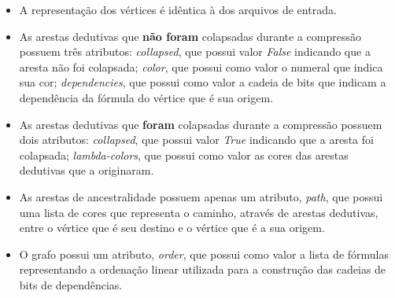 \begin{itemize}
    \item A representação dos vértices é idêntica à dos arquivos de entrada.
    \item As arestas dedutivas que \textbf{não foram} colapsadas durante a compressão possuem três atributos: \textit{collapsed}, que possui valor \textit{False} indicando que a aresta não foi colapsada; \textit{color}, que possui como valor o numeral que indica sua cor; \textit{dependencies}, que possui como valor a cadeia de bits que indicam a dependência da fórmula do vértice que é sua origem.
    \item As arestas dedutivas que \textbf{foram} colapsadas durante a compressão possuem dois atributos: \textit{collapsed}, que possui valor \textit{True} indicando que a aresta foi colapsada; \textit{lambda-colors}, que possui como valor as cores das arestas dedutivas que a originaram.
    \item As arestas de ancestralidade possuem apenas um atributo, \textit{path}, que possui uma lista de cores que representa o caminho, através de arestas dedutivas, entre o vértice que é seu destino e o vértice que é a sua origem.
    \item O grafo possui um atributo, \textit{order}, que possui como valor a lista de fórmulas representando a ordenação linear utilizada para a construção das cadeias de bits de dependências.
\end{itemize}

